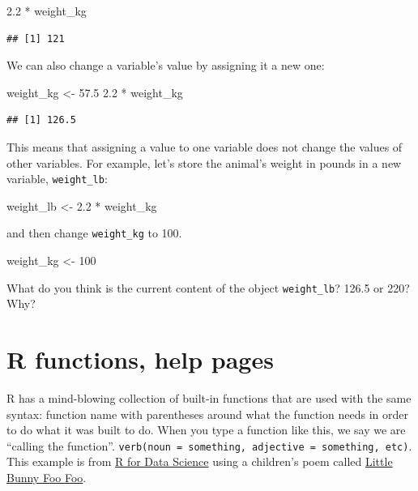 \documentclass[]{book}
\newenvironment{Shaded}{\begin{snugshade}}{\end{snugshade}}
\newcommand{\DecValTok}[1]{\textcolor[rgb]{0.00,0.00,0.81}{{#1}}}
\newcommand{\FloatTok}[1]{\textcolor[rgb]{0.00,0.00,0.81}{{#1}}}
\newcommand{\StringTok}[1]{\textcolor[rgb]{0.31,0.60,0.02}{{#1}}}
\newcommand{\NormalTok}[1]{{#1}}
\theoremstyle{definition}
\theoremstyle{definition}
\theoremstyle{definition}
\theoremstyle{remark}
\begin{document}
\begin{Shaded}
\begin{Highlighting}[]
\FloatTok{2.2} \NormalTok{*}\StringTok{ }\NormalTok{weight_kg}
\end{Highlighting}
\end{Shaded}

\begin{verbatim}
## [1] 121
\end{verbatim}

We can also change a variable's value by assigning it a new one:

\begin{Shaded}
\begin{Highlighting}[]
\NormalTok{weight_kg <-}\StringTok{ }\FloatTok{57.5}
\FloatTok{2.2} \NormalTok{*}\StringTok{ }\NormalTok{weight_kg}
\end{Highlighting}
\end{Shaded}

\begin{verbatim}
## [1] 126.5
\end{verbatim}

This means that assigning a value to one variable does not change the
values of other variables. For example, let's store the animal's weight
in pounds in a new variable, \texttt{weight\_lb}:

\begin{Shaded}
\begin{Highlighting}[]
\NormalTok{weight_lb <-}\StringTok{ }\FloatTok{2.2} \NormalTok{*}\StringTok{ }\NormalTok{weight_kg}
\end{Highlighting}
\end{Shaded}

and then change \texttt{weight\_kg} to 100.

\begin{Shaded}
\begin{Highlighting}[]
\NormalTok{weight_kg <-}\StringTok{ }\DecValTok{100}
\end{Highlighting}
\end{Shaded}

What do you think is the current content of the object
\texttt{weight\_lb}? 126.5 or 220? Why?

\section{R functions, help pages}\label{r-functions-help-pages}

R has a mind-blowing collection of built-in functions that are used with
the same syntax: function name with parentheses around what the function
needs in order to do what it was built to do. When you type a function
like this, we say we are ``calling the function''.
\texttt{verb(noun\ =\ something,\ adjective\ =\ something,\ etc)}. This
example is from \href{http://r4ds.had.co.nz/pipes}{R for Data Science}
using a children's poem called
\href{https://en.wikipedia.org/wiki/Little_Bunny_Foo_Foo}{Little Bunny
Foo Foo}.
\end{document}

